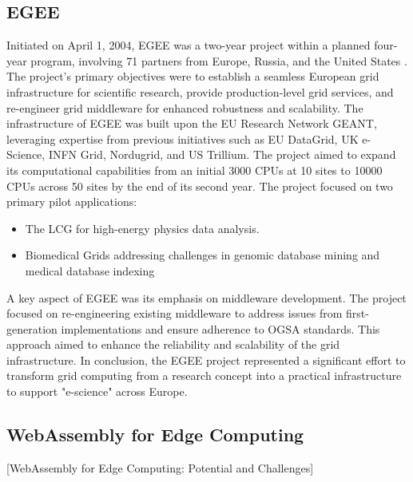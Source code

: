 \subsection{EGEE}
\label{subsec:background:related_work:egee}
Initiated on April 1, 2004, \ac{EGEE} was a two-year project within a planned four-year program, involving 71 partners from Europe, Russia, and the United States \cite{relatedwork:egee}. The project's primary objectives were to establish a seamless European grid infrastructure for scientific research, provide production-level grid services, and re-engineer grid middleware for enhanced robustness and scalability.
The infrastructure of \ac{EGEE} was built upon the EU Research Network GEANT, leveraging expertise from previous initiatives such as EU DataGrid, UK e-Science, INFN Grid, Nordugrid, and US Trillium. The project aimed to expand its computational capabilities from an initial 3000 CPUs at 10 sites to 10000 CPUs across 50 sites by the end of its second year.
The project focused on two primary pilot applications: 
\begin{itemize}
  \item The \ac{LCG} for high-energy physics data analysis.
  \item Biomedical Grids addressing challenges in genomic database mining and medical database indexing
\end{itemize}
A key aspect of EGEE was its emphasis on middleware development. The project focused on re-engineering existing middleware to address issues from first-generation implementations and ensure adherence to \ac{OGSA} standards. This approach aimed to enhance the reliability and scalability of the grid infrastructure.
In conclusion, the \ac{EGEE} project represented a significant effort to transform grid computing from a research concept into a practical infrastructure to support "e-science" across Europe. \cite{relatedwork:egee}

\subsection{WebAssembly for Edge Computing}
\label{subsec:background:related_work:wasmedgecomputing}
[WebAssembly for Edge Computing: Potential and Challenges] \cite{relatedwork:wasmedgecomputing}